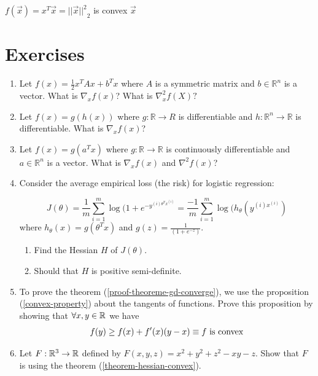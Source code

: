\begin{example}
$f(\vec{x})=x^T\vec{x}={||\vec{x}||^2}_2$ is convex $\vec{x}$
\end{example}


\section{Exercises}



\begin{enumerate}
    \item Let $f(x) = \frac{1}{2} x^T A x + b^T x$ where $A$ is a symmetric matrix and  $b \in \mathbb R^n$ is a vector. What is $\nabla_x f(x)$? What is $\nabla^2_x f(X)?$
    \item Let $f(x) = g(h(x))$ where $g: \mathbb R \rightarrow R$ is differentiable and $h : \mathbb R^{n} \rightarrow \mathbb R$ is differentiable. What is $\nabla_x f(x)$? 
    \item Let $f(x) = g(a^T x)$ where $g : \mathbb R \rightarrow \mathbb R$ is continuously differentiable and $a \in \mathbb R^n$ is a vector. What is $\nabla_x f(x)$ and $\nabla^2 f(x)$?
    \item Consider the average empirical loss (the risk) for logistic regression: 

    $$J(\theta) = \frac{1}{m} \sum_{i = 1}^m \log(1 + e^{- y^{(i) \theta^T x^{(i)}} } = \frac{-1}{m} \sum_{i = 1}^m \log(h_{\theta}(y^{(i) x^{(i)}})$$
    where $h_{\theta}(x) = g(\theta^T x)$ and $g(z) = \frac{1}{(1 + e^{-z})}$. 
    \begin{enumerate}
    \item Find the Hessian $H$ of $J(\theta)$. 
    \item Should that $H$ is positive semi-definite. 
    \end{enumerate}
        \item To prove the theorem (\ref{proof-theoreme-gd-converge}), we use the proposition (\ref{convex-property}) about the tangents of \cvx{} functions. Prove this proposition by showing that $\forall x,y \in \R$ we have $$f(y) \geq f(x) + f'(x)(y-x) \equiv f \text{ is \cvx}$$
            \item Let $F: \R^3 \to \R$ defined by $F(x,y,z) = x^2 + y^2 + z^2 - xy -z$. Show that $F$ is \cvx{} using the theorem (\ref{theorem-hessian-convex}).
\end{enumerate}

